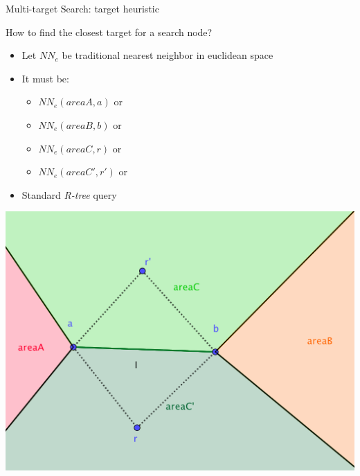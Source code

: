 \begin{frame}{Multi-target Search: target heuristic}
\begin{minipage}{.4\textwidth}
\small{
    How to find the closest target for a search node?
}
\begin{itemize}
    \item<2-> \small{Let $NN_e$ be traditional nearest neighbor in euclidean space}
    \item<3-> \small{It must be:}
    \begin{itemize}
        \item<4-> $NN_e(areaA, a)$ or
        \item<5-> $NN_e(areaB, b)$ or
        \item<6-> $NN_e(areaC, r)$ or
        \item<7-> $NN_e(areaC', r')$ or
    \end{itemize}
    \item<8-> Standard \textit{R-tree} query
\end{itemize}

\end{minipage}%
\begin{minipage}{.6\textwidth}
    \begin{adjustbox}{max totalsize={.9\textwidth}{.9\textheight}, right}
    \centering
    \includegraphics{pic/heuristic.png}
    \end{adjustbox}
\end{minipage}
\end{frame}


